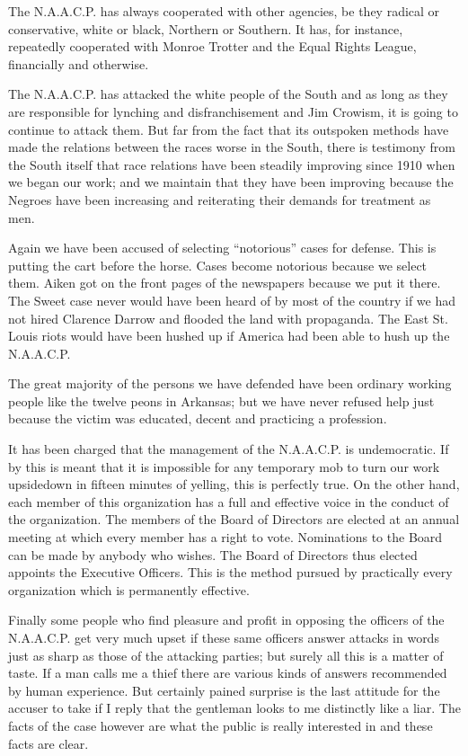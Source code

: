 \documentclass[letterpaper,10pt,english]{jupyterBook}
\begin{document}
\sphinxAtStartPar
The N.A.A.C.P. has always cooperated with other agencies, be they radical or conservative, white or black, Northern or Southern. It has, for instance, repeatedly cooperated with Monroe Trotter and the Equal Rights League, financially and otherwise.

\sphinxAtStartPar
The N.A.A.C.P. has attacked the white people of the South and as long as they are responsible for lynching and disfranchisement and Jim Crowism, it is going to continue to attack them. But far from the fact that its outspoken methods have made the relations between the races worse in the South, there is testimony from the South itself that race relations have been steadily improving since 1910 when we began our work; and we maintain that they have been improving because the Negroes have been increasing and reiterating their demands for treatment as men.

\sphinxAtStartPar
Again we have been accused of selecting “notorious” cases for defense. This is putting the cart before the horse. Cases become notorious because we select them. Aiken got on the front pages of the newspapers because we put it there. The Sweet case never would have been heard of by most of the country if we had not hired Clarence Darrow and flooded the land with propaganda. The East St. Louis riots would have been hushed up if America had been able to hush up the N.A.A.C.P.

\sphinxAtStartPar
The great majority of the persons we have defended have been ordinary working people like the twelve peons in Arkansas; but we have never refused help just because the victim was educated, decent and practicing a profession.

\sphinxAtStartPar
It has been charged that the management of the N.A.A.C.P. is undemocratic. If by this is meant that it is impossible for any temporary mob to turn our work up\sphinxhyphen{}side\sphinxhyphen{}down in fifteen minutes of yelling, this is perfectly true. On the other hand, each member of this organization has a full and effective voice in the conduct of the organization. The members of the Board of Directors are elected at an annual meeting at which every member has a right to vote. Nominations to the Board can be made by anybody who wishes. The Board of Directors thus elected appoints the Executive Officers. This is the method pursued by practically every organization which is permanently effective.

\sphinxAtStartPar
Finally some people who find pleasure and profit in opposing the officers of the N.A.A.C.P. get very much up\sphinxhyphen{}set if these same officers answer attacks in words just as sharp as those of the attacking parties; but surely all this is a matter of taste. If a man calls me a thief there are various kinds of answers recommended by human experience. But certainly pained surprise is the last attitude for the accuser to take if I reply that the gentleman looks to me distinctly like a liar. The facts of the case however are what the public is really interested in and these facts are clear.
\end{document}

